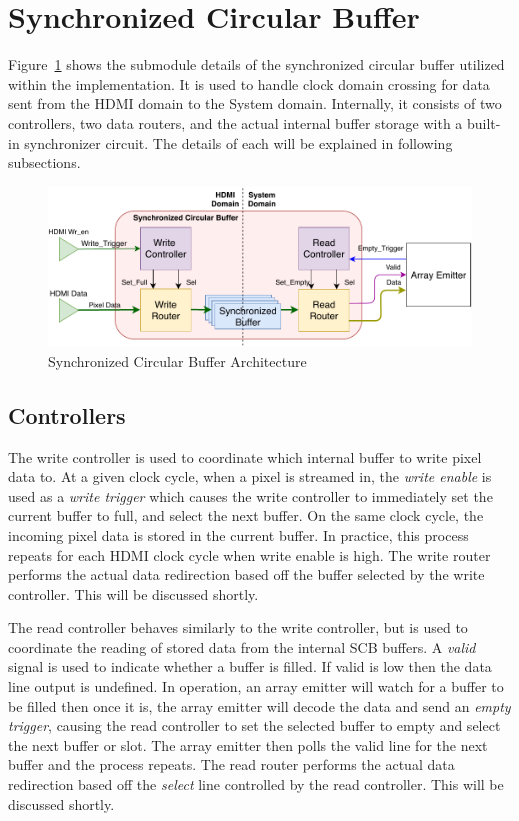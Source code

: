 \section{Synchronized Circular Buffer}

    Figure~\ref{fig:scb_arch} shows the submodule details of the synchronized circular buffer utilized within the implementation. It is used to handle clock domain crossing for data sent from the HDMI domain to the System domain. Internally, it consists of two controllers, two data routers, and the actual internal buffer storage with a built-in synchronizer circuit. The details of each will be explained in following subsections.

    \begin{figure}
        \centering
        \includegraphics[width=1.0\textwidth]{fig/pdp_scb_arch.pdf}
        \caption{Synchronized Circular Buffer Architecture}
        \label{fig:scb_arch}
    \end{figure}

    \subsection{Controllers}
        The write controller is used to coordinate which internal buffer to write pixel data to. At a given clock cycle, when a pixel is streamed in, the {\it write enable} is used as a {\it write trigger} which causes the write controller to immediately set the current buffer to full, and select the next buffer. On the same clock cycle, the incoming pixel data is stored in the current buffer. In practice, this process repeats for each HDMI clock cycle when write enable is high. The write router performs the actual data redirection based off the buffer selected by the write controller. This will be discussed shortly.

        The read controller behaves similarly to the write controller, but is used to coordinate the reading of stored data from the internal SCB buffers. A {\it valid} signal is used to indicate whether a buffer is filled. If valid is low then the data line output is undefined. In operation, an array emitter will watch for a buffer to be filled then once it is, the array emitter will decode the data and send an {\it empty trigger}, causing the read controller to set the selected buffer to empty and select the next buffer or slot. The array emitter then polls the valid line for the next buffer and the process repeats. The read router performs the actual data redirection based off the {\it select} line controlled by the read controller. This will be discussed shortly.

